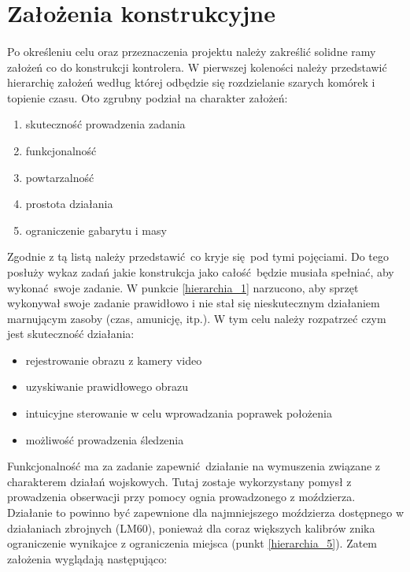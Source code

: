 \section{Założenia konstrukcyjne}
\paragraph{}Po określeniu celu oraz przeznaczenia projektu należy zakreślić solidne ramy założeń co do konstrukcji kontrolera. W pierwszej koleności należy przedstawić hierarchię założeń według której odbędzie się rozdzielanie szarych komórek i topienie czasu. Oto zgrubny podział na charakter założeń:

\begin{enumerate}
  \item skuteczność prowadzenia zadania \label{hierarchia_1}
  \item funkcjonalność
  \item powtarzalność
  \item prostota działania
  \item ograniczenie gabarytu i masy \label{hierarchia_5}
\end{enumerate}

Zgodnie z tą listą należy przedstawić co kryje się pod tymi pojęciami. Do tego posłuży wykaz zadań jakie konstrukcja jako całość będzie musiała spełniać, aby wykonać swoje zadanie. W punkcie \ref{hierarchia_1} narzucono, aby sprzęt wykonywał swoje zadanie prawidłowo i nie stał się nieskutecznym działaniem marnującym zasoby (czas, amunicję, itp.). W tym celu należy rozpatrzeć czym jest skuteczność działania:

\begin{itemize}
  \item rejestrowanie obrazu z kamery video
  \item uzyskiwanie prawidłowego obrazu
  \item intuicyjne sterowanie w celu wprowadzania poprawek położenia
  \item możliwość prowadzenia śledzenia
\end{itemize}

Funkcjonalność ma za zadanie zapewnić działanie na wymuszenia związane z charakterem działań wojskowych. Tutaj zostaje wykorzystany pomysł z prowadzenia obserwacji przy pomocy ognia prowadzonego z moździerza. Działanie to powinno być zapewnione dla najmniejszego moździerza dostępnego w działaniach zbrojnych (LM60), ponieważ dla coraz większych kalibrów znika ograniczenie wynikajce z ograniczenia miejsca (punkt \ref{hierarchia_5}). Zatem założenia wyglądają następująco:

